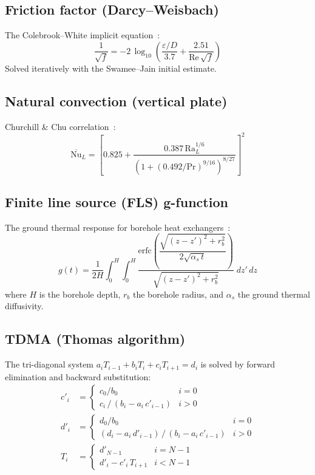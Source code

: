\subsection{Friction factor (Darcy--Weisbach)}

The Colebrook--White implicit equation~\cite{colebrook1939}:
\begin{equation}\label{eq:colebrook}
  \frac{1}{\sqrt{f}} = -2\,\log_{10}\!\left(\frac{\varepsilon/D}{3.7} + \frac{2.51}{\text{Re}\,\sqrt{f}}\right)
\end{equation}
Solved iteratively with the Swamee--Jain initial estimate.

\subsection{Natural convection (vertical plate)}

Churchill \& Chu correlation~\cite{churchill1975}:
\begin{equation}\label{eq:churchill-chu}
  \overline{\text{Nu}}_L = \left[0.825 + \frac{0.387\,\text{Ra}_L^{1/6}}{\left(1 + (0.492/\text{Pr})^{9/16}\right)^{8/27}}\right]^2
\end{equation}

\subsection{Finite line source (FLS) g-function}

The ground thermal response for borehole heat exchangers~\cite{eskilson1987}:
\begin{equation}\label{eq:fls-g}
  g(t) = \frac{1}{2H}\int_0^H \int_0^H
    \frac{\text{erfc}\!\left(\dfrac{\sqrt{(z-z')^2 + r_b^2}}{2\sqrt{\alpha_s\,t}}\right)}{\sqrt{(z-z')^2 + r_b^2}}\;dz'\,dz
\end{equation}
where $H$ is the borehole depth, $r_b$ the borehole radius, and $\alpha_s$ the ground thermal diffusivity.

\subsection{TDMA (Thomas algorithm)}

The tri-diagonal system $a_i T_{i-1} + b_i T_i + c_i T_{i+1} = d_i$ is solved by forward elimination and backward substitution:
\begin{align}
  c'_i &= \begin{cases} c_0/b_0 & i = 0 \\ c_i\,/\,(b_i - a_i\,c'_{i-1}) & i > 0 \end{cases} \label{eq:tdma-c}\\
  d'_i &= \begin{cases} d_0/b_0 & i = 0 \\ (d_i - a_i\,d'_{i-1})\,/\,(b_i - a_i\,c'_{i-1}) & i > 0 \end{cases} \label{eq:tdma-d}\\
  T_i  &= \begin{cases} d'_{N-1} & i = N-1 \\ d'_i - c'_i\,T_{i+1} & i < N-1 \end{cases} \label{eq:tdma-T}
\end{align}
